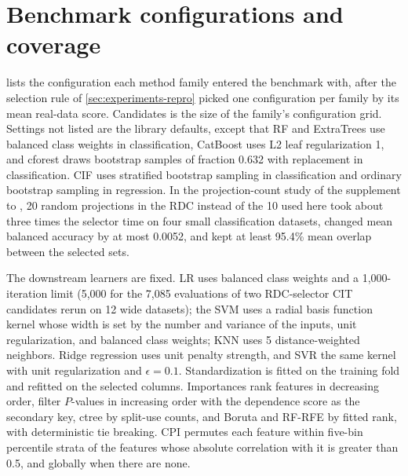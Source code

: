 \section{Benchmark configurations and coverage}
\label{app:methods}
\label{app:selected-configs}

 lists the configuration each method family entered
the benchmark with, after the selection rule of \cref{sec:experiments-repro}
picked one configuration per family by its mean real-data score. Candidates is
the size of the family's configuration grid. Settings not listed are the
library defaults, except that RF and ExtraTrees use balanced class weights in
classification, CatBoost uses L2 leaf regularization 1, and cforest draws
bootstrap samples of fraction 0.632 with replacement in classification. CIF uses stratified bootstrap sampling in classification and
ordinary bootstrap sampling in regression. In the projection-count study of the
supplement to \citet{MilletichDownesHirst2026citrees}, 20 random projections in
the RDC instead of the 10 used here took about three times the selector time on
four small classification datasets, changed mean balanced accuracy by at most
0.0052, and kept at least 95.4\% mean overlap between the selected sets.

The downstream learners are fixed. LR uses balanced class weights and a
1,000-iteration limit (5,000 for the 7,085 evaluations of two RDC-selector CIT
candidates rerun on 12 wide datasets); the SVM uses a radial basis function kernel whose width
is set by the number and variance of the inputs, unit regularization, and
balanced class weights; KNN uses 5 distance-weighted neighbors. Ridge
regression uses unit penalty strength, and SVR the same kernel with unit
regularization and $\epsilon=0.1$. Standardization is fitted on the training
fold and refitted on the selected columns. Importances rank features in
decreasing order, filter $P$-values in increasing order with the dependence
score as the secondary key, ctree by split-use counts, and Boruta and RF-RFE by
fitted rank, with deterministic tie breaking. CPI permutes each feature within
five-bin percentile strata of the features whose absolute correlation with it
is greater than 0.5, and globally when there are none.

